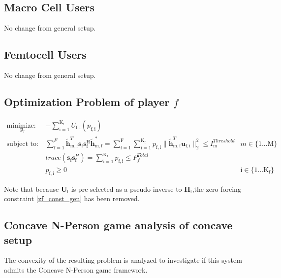 \documentclass[12pt,a4paper]{report}
\begin{document}
\subsection{Macro Cell Users}
No change from general setup.

\subsection{Femtocell Users}
No change from general setup.



\subsection{Optimization Problem of player $f$}\label{conproblem}


	\begin{subequations}
	\label{optim}
	\begin{align}
	    \underset{\mathbf{p}_{\mathrm{f}} }{\text{minimize: }} \;
	    & - \sum_{\mathrm{i=1}}^{\mathrm{K_f}}
    	U_{\mathrm{f,i}}(p_{\mathrm{f,i}}) \label{player_opt_c} \\
	    \text{subject to: } \; &
	  \sum^F_{\text{f}=1} \mathbf{\tilde{h}}_{\mathrm{m,f}}^T  \mathbf{s}_{\mathrm{f}} 						
	\mathbf{s_{\mathrm{f}}^{\mathrm{H}}} \mathbf{\tilde{h}_{\mathrm{m,f}}^*} 
	=
	\sum_{\mathrm{f=1}}^{\mathrm{F}}	\sum_{\mathrm{i=1}}^{\mathrm{K_f}}
	p_{\mathrm{f,i}}\|\tilde{\mathbf{h}}_{\mathrm{m,f}}^T \mathbf{u}_{\mathrm{f,i}}\|^2_2
	\leq I^{Threshold}		
	_{\mathrm{m}} & m \in \{1 ...\text{M}\} 
		\label{interference_const_c}\\
        & trace(\mathbf{s}_\mathrm{f}\mathbf{s}_\mathrm{f}^H) =
        	\sum_{\mathrm{i=1}}^{\mathrm{K_{\mathrm{f}}}} p_{\mathrm{f,i}}
	   \leq P^{Total}_{f}  \label{power_const_c}\\
        & p_{\mathrm{f,i}} \geq 0 &  \text{i} \in \{1 ...\text{K}_{\mathrm{f}}\} \label{pos_power_const_c}
	\end{align}
	\end{subequations}

Note that because $\mathbf{U}_{\mathrm{f}}$ is pre-selected as a pseudo-inverse to  $\mathbf{H_\mathrm{f}}$,the zero-forcing constraint \eqref{zf_const_gen} has been removed.

\subsection{Concave N-Person game analysis of concave setup}
The convexity of the resulting problem is analyzed to investigate if this system admits the Concave N-Person game framework. 
\end{document}
